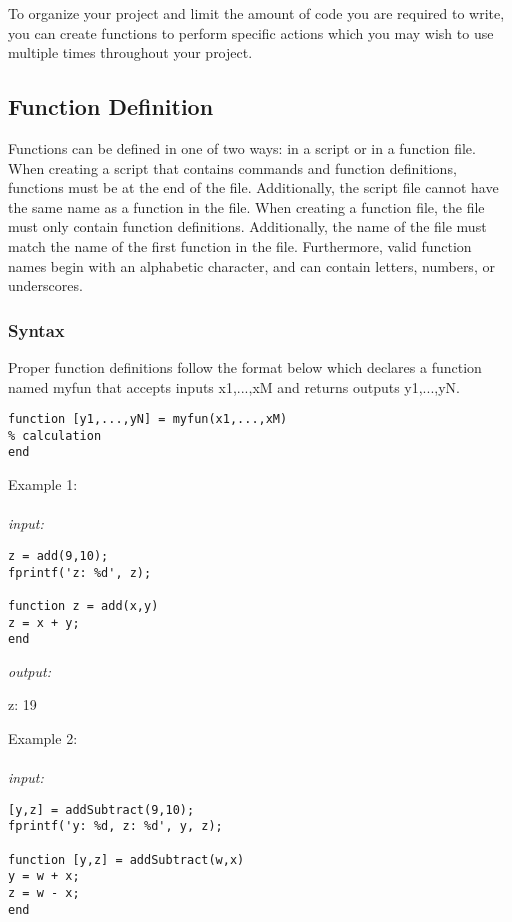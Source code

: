 \documentclass[../MATLAB_Primer.tex]{subfiles}
\begin{document}
To organize your project and limit the amount of code you are required to write, you can create functions to perform specific actions which you may wish to use multiple times throughout your project. 

\subsection{Function Definition}

Functions can be defined in one of two ways: in a script or in a function file. When creating a script that contains commands and function definitions, functions must be at the end of the file. Additionally, the script file cannot have the same name as a function in the file. When creating a function file, the file must only contain function definitions. Additionally, the name of the file must match the name of the first function in the file. Furthermore, valid function names begin with an alphabetic character, and can contain letters, numbers, or underscores.

\subsubsection{Syntax}

Proper function definitions follow the format below which declares a function named myfun that accepts inputs x1,...,xM and returns outputs y1,...,yN.
\\
\begin{lstlisting}[frame=single]
function [y1,...,yN] = myfun(x1,...,xM) 
% calculation
end
\end{lstlisting}

Example 1:
\\ \\
\textit{input:}
\begin{lstlisting}[frame=single]
z = add(9,10);
fprintf('z: %d', z);

function z = add(x,y) 
z = x + y;
end
\end{lstlisting}

\textit{output:}

\begin{center}
    z: 19
\end{center}

Example 2:
\\ \\
\textit{input:}
\begin{lstlisting}[frame=single]
[y,z] = addSubtract(9,10);
fprintf('y: %d, z: %d', y, z);

function [y,z] = addSubtract(w,x) 
y = w + x;
z = w - x;
end
\end{lstlisting}
\end{document}
